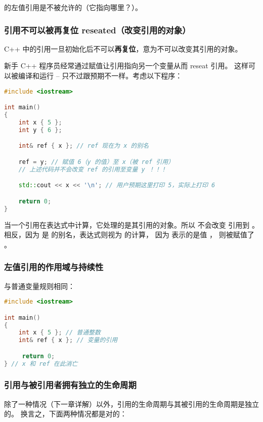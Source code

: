 \documentclass[../../LearnCpp.tex]{subfiles}
\begin{document}
 的左值引用是不被允许的（它指向哪里？）。

\subsubsection*{引用不可以被再复位 reseated（改变引用的对象）}

C++ 中的引用一旦初始化后不可以\textbf{再复位}，意为不可以改变其引用的对象。

新手 C++ 程序员经常通过赋值让引用指向另一个变量从而 reseat 引用。
这样可以被编译和运行 -- 只不过跟预期不一样。考虑以下程序：

\begin{lstlisting}[language=C++]
#include <iostream>

int main()
{
    int x { 5 };
    int y { 6 };

    int& ref { x }; // ref 现在为 x 的别名

    ref = y; // 赋值 6（y 的值）至 x（被 ref 引用）
    // 上述代码并不会改变 ref 的引用至变量 y ！！！

    std::cout << x << '\n'; // 用户预期这里打印 5，实际上打印 6

    return 0;
}
\end{lstlisting}

当一个引用在表达式中计算，它处理的是其引用的对象。所以  不会改变  引用到 。
相反，因为  是  的别名，表达式则视为  的计算，
因为  表示的是值 ， 则被赋值了 。

\subsubsection*{左值引用的作用域与持续性}

与普通变量规则相同：

\begin{lstlisting}[language=C++]
#include <iostream>

int main()
{
    int x { 5 }; // 普通整数
    int& ref { x }; // 变量的引用

     return 0;
} // x 和 ref 在此消亡
\end{lstlisting}

\subsubsection*{引用与被引用者拥有独立的生命周期}

除了一种情况（下一章详解）以外，引用的生命周期与其被引用的生命周期是独立的。
换言之，下面两种情况都是对的：
\end{document}
